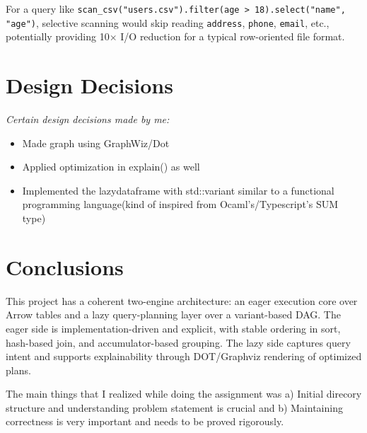 \documentclass[11pt,a4paper]{article}
\begin{document}
For a query like \texttt{scan\_csv("users.csv").filter(age > 18).select("name", "age")}, selective scanning would skip reading \texttt{address}, \texttt{phone}, \texttt{email}, etc., potentially providing 10\(\times\) I/O reduction for a typical row-oriented file format.

\section{Design Decisions}

\textit{Certain design decisions made by me:}
\begin{itemize}[leftmargin=*]
	\item Made graph using GraphWiz/Dot
    \item Applied optimization in explain() as well
    \item Implemented the lazydataframe with std::variant similar to a functional programming language(kind of inspired from Ocaml's/Typescript's SUM type)
\end{itemize}

\section{Conclusions}

This project has a coherent two-engine architecture: an eager execution core over Arrow tables and a lazy query-planning layer over a variant-based DAG. The eager side is implementation-driven and explicit, with stable ordering in sort, hash-based join, and accumulator-based grouping. The lazy side captures query intent and supports explainability through DOT/Graphviz rendering of optimized plans.

The main things that I realized while doing the assignment was a) Initial direcory structure and understanding problem statement is crucial and b) Maintaining correctness is very important and needs to be proved rigorously.
\end{document}
